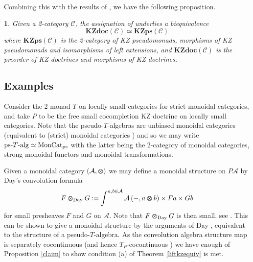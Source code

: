 \documentclass[a4paper,oneside,english]{amsart}
\numberwithin{equation}{section}
\numberwithin{figure}{section}
\theoremstyle{plain}
\theoremstyle{definition}
\theoremstyle{remark}
\theoremstyle{definition}
\theoremstyle{plain}
\newtheorem{prop}[thm]{\protect\propositionname}
\theoremstyle{plain}
\theoremstyle{plain}
\providecommand{\propositionname}{Proposition}
\begin{document}
Combining this with the results of \cite{marm2012}, we have the following
proposition.
\begin{prop}
Given a 2-category $\mathscr{C}$, the assignation of \cite[Theorems 4.1,4.2]{marm2012}
underlies a biequivalence
\[
\mathbf{KZdoc}\left(\mathscr{C}\right)\simeq\mathbf{KZps}\left(\mathscr{C}\right)
\]
where $\mathbf{KZps}\left(\mathscr{C}\right)$ is the 2-category of
KZ pseudomonads, morphisms of KZ pseudomonads and isomorphisms of
left extensions, and $\mathbf{KZdoc}\left(\mathscr{C}\right)$ is
the preorder of KZ doctrines and morphisms of KZ doctrines.
\end{prop}

\subsection{Examples}

Consider the 2-monad $T$ on locally small categories for strict monoidal
categories, and take $P$ to be the free small cocompletion KZ doctrine
on locally small categories. Note that the pseudo-$T$-algebras are
unbiased monoidal categories (equivalent to (strict) monoidal categories
\cite{leinster}) and so we may write $\textnormal{ps-}T\textnormal{-alg}\simeq\textnormal{MonCat}_{\textnormal{ps}}$
with the latter being the 2-category of monoidal categories, strong
monoidal functors and monoidal transformations. 

Given a monoidal category $\left(\mathcal{A},\varotimes\right)$ we
may define a monoidal structure on $P\mathcal{A}$ by Day's convolution
formula
\[
F\varotimes_{\textnormal{Day}}G:=\int^{a,b\in\mathcal{A}}\mathcal{A}\left(-,a\varotimes b\right)\times Fa\times Gb
\]
for small presheaves $F$ and $G$ on $\mathcal{A}$. Note that $F\varotimes_{\textnormal{Day}}G$
is then small, see \cite[Section 7]{daylack2007}. This can be shown
to give a monoidal structure by the arguments of Day \cite{dayconvolution},
equivalent to the structure of a pseudo-$T$-algebra. As the convolution
algebra structure map is separately cocontinuous (and hence $T_{P}$-cocontinuous
\cite[Prop. 2.3.2]{markextension}) we have enough of Proposition
\ref{claim} to show condition (a) of Theorem \ref{liftkzequiv} is
met.
\end{document}
